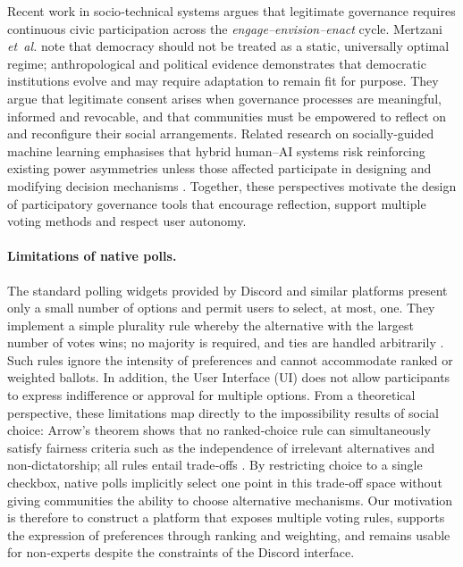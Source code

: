 Recent work in socio‑technical systems argues that legitimate governance
requires continuous civic participation across the \emph{engage–envision–enact}
cycle.  Mertzani \emph{et~al.} \cite{Mertzani2023Engage} note that democracy should not be treated as a
static, universally optimal regime; anthropological and political evidence
demonstrates that democratic institutions evolve and may require adaptation to
remain fit for purpose.  They argue that legitimate
consent arises when governance processes are meaningful, informed and
revocable, and that communities must be empowered to reflect on and
reconfigure their social arrangements.  Related research on socially‑guided
machine learning emphasises that hybrid human–AI systems risk reinforcing
existing power asymmetries unless those affected participate in designing and
modifying decision mechanisms \cite{Mertzani2025SGML}.  Together, these
perspectives motivate the design of participatory governance tools that
encourage reflection, support multiple voting methods and respect user
autonomy.

\paragraph{Limitations of native polls.}  The standard polling
widgets provided by Discord and similar platforms present only a small
 number of options and permit users to select, at most, one.  They
implement a simple plurality rule whereby the alternative with the
largest number of votes wins; no majority is required, and ties are
handled arbitrarily \cite{Black1958}.  Such rules ignore the intensity of
preferences and cannot accommodate ranked or weighted ballots.  In
 addition, the User Interface (UI) does not allow participants to express
indifference or approval for multiple options.  From a theoretical
 perspective, these limitations map directly to the impossibility
results of social choice: Arrow’s theorem shows that no ranked‑choice
rule can simultaneously satisfy fairness criteria such as the
independence of irrelevant alternatives and non‑dictatorship; all
rules entail trade‑offs \cite{Arrow1951}.  By restricting
choice to a single checkbox, native polls implicitly select one point
in this trade‑off space without giving communities the ability to
choose alternative mechanisms.  Our motivation is therefore to
construct a platform that exposes multiple voting rules, supports
the expression of preferences through ranking and weighting, and remains usable for
non‑experts despite the constraints of the Discord interface.

